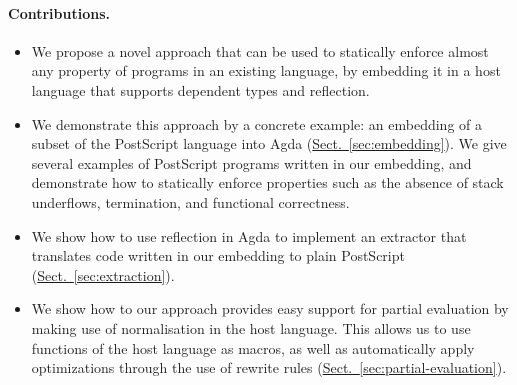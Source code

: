 \documentclass[sigplan,screen,anonymous,review]{acmart}
\newcommand{\myref}[2]{\hyperref[#2]{#1~\ref*{#2}}}
\newcommand{\secref}[1]{\myref{Sect.}{sec:#1}}
\begin{document}
\paragraph{Contributions.}
\begin{itemize}

\item We propose a novel approach that can be used to statically
  enforce almost any property of programs in an existing language, by
  embedding it in a host language that supports dependent types and
  reflection.

\item We demonstrate this approach by a concrete example: an embedding
  of a subset of the PostScript language into Agda
  (\secref{embedding}). We give several examples of PostScript
  programs written in our embedding, and demonstrate how to statically
  enforce properties such as the absence of stack underflows,
  termination, and functional correctness.

\item We show how to use reflection in Agda to implement an extractor
  that translates code written in our embedding to plain PostScript
  (\secref{extraction}).

\item We show how to our approach provides easy support for partial
  evaluation by making use of normalisation in the host language. This
  allows us to use functions of the host language as macros, as well
  as automatically apply optimizations through the use of rewrite
  rules (\secref{partial-evaluation}).
\end{itemize}

\begin{comment}
The rest of this paper is structured as follows. \secref{background}
provides background information on Agda and its reflection
capabilities. \secref{embedding} describes our embedding of PostScript
in Agda, and gives several examples of programs written in
it. \secref{extraction} shows how to implement an extractor for this
embedding using reflection. Next, \secref{partial-evaluation}
demonstrates how to apply partial evaluation to programs prior to
extraction by using Agda's normalisation procedure. Finally,
\secref{related} discusses related work and \secref{conclusion}
concludes.
\end{comment}

\begin{comment}
\todo[inline]{Move it somewhere}
This picture has been generated by the code that was extracted from our
Agda embedding.

\begin{center}
\epsfbox[0 0 64 64]{sierp.ps}
\end{center}
\end{comment}
\end{document}
